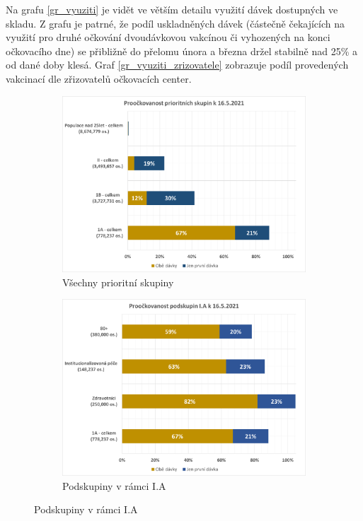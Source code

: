 Na grafu \ref{gr_vyuziti} je vidět ve větším detailu využití dávek dostupných ve skladu. Z grafu je patrné, že podíl uskladněných dávek (částečně čekajících na využití pro druhé očkování dvoudávkovou vakcínou či vyhozených na konci očkovacího dne) se přibližně do přelomu února a března držel stabilně nad 25\% a od dané doby klesá.
%
Graf \ref{gr_vyuziti_zrizovatele} zobrazuje podíl provedených vakcinací dle zřizovatelů očkovacích center.





\begin{figure}
\centering

\begin{subfigure}{0.9\textwidth}
\includegraphics[height=0.3\textheight, width=\textwidth]{assets/proockovanost_vsechnyPS}
\caption{Všechny prioritní skupiny}
\label{proockovanost_ps_vsechny}
\end{subfigure}

\begin{subfigure}{0.9\textwidth}
\includegraphics[height=0.3\textheight, width=\textwidth]{assets/proockovanost_1A}
\caption{Podskupiny v rámci I.A}
\label{proockovanost_ps_1a}
\end{subfigure}


\end{figure}
